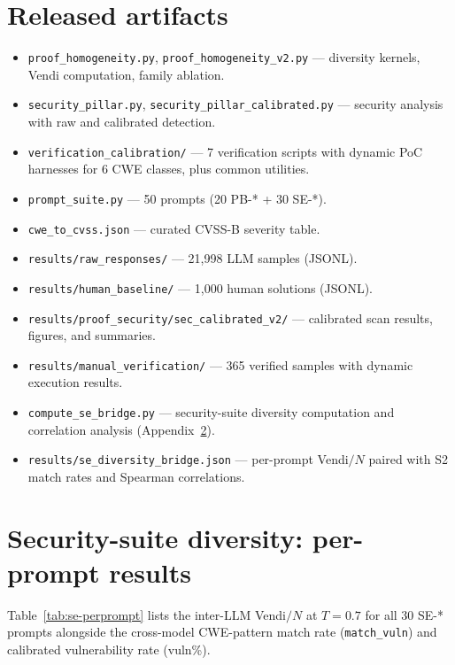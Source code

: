 \documentclass{article}
\begin{document}
\section{Released artifacts}
\label{app:artifacts}

\begin{itemize}[leftmargin=*]
  \item \texttt{proof\_homogeneity.py}, \texttt{proof\_homogeneity\_v2.py}
    --- diversity kernels, Vendi computation, family ablation.
  \item \texttt{security\_pillar.py}, \texttt{security\_pillar\_calibrated.py}
    --- security analysis with raw and calibrated detection.
  \item \texttt{verification\_calibration/} --- 7 verification scripts with
    dynamic PoC harnesses for 6 CWE classes, plus common utilities.
  \item \texttt{prompt\_suite.py} --- 50 prompts (20 PB-* + 30 SE-*).
  \item \texttt{cwe\_to\_cvss.json} --- curated CVSS-B severity table.
  \item \texttt{results/raw\_responses/} --- 21,998 LLM samples (JSONL).
  \item \texttt{results/human\_baseline/} --- 1,000 human solutions (JSONL).
  \item \texttt{results/proof\_security/sec\_calibrated\_v2/} --- calibrated
    scan results, figures, and summaries.
  \item \texttt{results/manual\_verification/} --- 365 verified samples with
    dynamic execution results.
  \item \texttt{compute\_se\_bridge.py} --- security-suite diversity
    computation and correlation analysis (Appendix~\ref{app:se-diversity}).
  \item \texttt{results/se\_diversity\_bridge.json} --- per-prompt Vendi$/N$
    paired with S2 match rates and Spearman correlations.
\end{itemize}

\section{Security-suite diversity: per-prompt results}
\label{app:se-diversity}

Table~\ref{tab:se-perprompt} lists the inter-LLM Vendi$/N$ at $T{=}0.7$
for all 30 SE-* prompts alongside the cross-model CWE-pattern match rate
(\texttt{match\_vuln}) and calibrated vulnerability rate (vuln\%).
\end{document}
